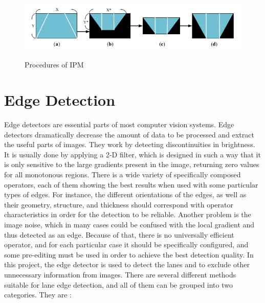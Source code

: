  \begin{center}
\end{center}

\begin{figure}[H]
 \centering
  \includegraphics[width=1\textwidth]{./Bilder/Procedures_of_IPM.png}\label{Procedures_of_IPM}
  \caption{Procedures of IPM\cite{IPM}}
\end{figure}


%
\section{Edge Detection}\label{sec:Edge Detection}
%

Edge detectors are essential parts of most computer vision systems. Edge detectors dramatically decrease the amount of data to be processed and extract the useful parts of images. They work by detecting discontinuities in brightness. It is usually done by applying a 2-D filter, which is designed in such a way that it is only sensitive to the large gradients present in the image, returning zero values for all monotonous regions. There is a wide variety of specifically composed operators, each of them showing the best results when used with some particular types of edges. For instance, the different orientations of the edges, as well as their geometry, structure, and thickness should correspond with operator characteristics in order for the detection to be reliable. Another problem is the image noise, which in many cases could be confused with the local gradient and thus detected as an edge. Because of that, there is no universally efficient operator, and for each particular case it should be specifically configured, and some pre-editing must be used in order to achieve the best detection quality. In this project, the edge detector is used to detect the lanes and to exclude other unnecessary information from images. There are several different methods suitable for lane edge detection, and all of them can be grouped into two categories. They are :

